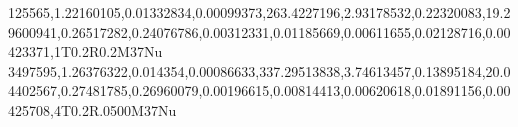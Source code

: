 125565,1.22160105,0.01332834,0.00099373,263.4227196,2.93178532,0.22320083,19.29600941,0.26517282,0.24076786,0.00312331,0.01185669,0.00611655,0.02128716,0.00423371,1T0.2R0.2M37Nu
3497595,1.26376322,0.014354,0.00086633,337.29513838,3.74613457,0.13895184,20.04402567,0.27481785,0.26960079,0.00196615,0.00814413,0.00620618,0.01891156,0.00425708,4T0.2R.0500M37Nu
